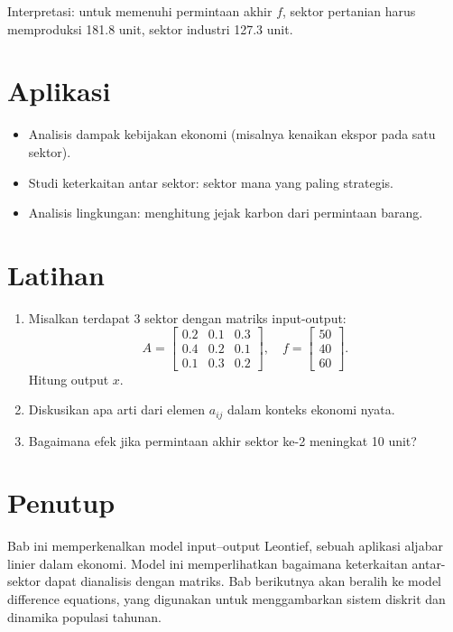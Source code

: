 \documentclass{bukumjh}
\begin{document}
Interpretasi: untuk memenuhi permintaan akhir $f$, sektor pertanian harus memproduksi 181.8 unit, sektor industri 127.3 unit.

\section{Aplikasi}
\begin{itemize}
    \item Analisis dampak kebijakan ekonomi (misalnya kenaikan ekspor pada satu sektor).
    \item Studi keterkaitan antar sektor: sektor mana yang paling strategis.
    \item Analisis lingkungan: menghitung jejak karbon dari permintaan barang.
\end{itemize}

\section{Latihan}
\begin{enumerate}
    \item Misalkan terdapat 3 sektor dengan matriks input-output:
    \[
    A = \begin{bmatrix}
    0.2 & 0.1 & 0.3 \\
    0.4 & 0.2 & 0.1 \\
    0.1 & 0.3 & 0.2
    \end{bmatrix}, \quad
    f = \begin{bmatrix}
    50 \\ 40 \\ 60
    \end{bmatrix}.
    \]
    Hitung output $x$.
    \item Diskusikan apa arti dari elemen $a_{ij}$ dalam konteks ekonomi nyata.
    \item Bagaimana efek jika permintaan akhir sektor ke-2 meningkat 10 unit?
\end{enumerate}

\section{Penutup}
Bab ini memperkenalkan model input–output Leontief, sebuah aplikasi aljabar linier dalam ekonomi. Model ini memperlihatkan bagaimana keterkaitan antar-sektor dapat dianalisis dengan matriks. Bab berikutnya akan beralih ke {\jsg model difference equations}, yang digunakan untuk menggambarkan sistem diskrit dan dinamika populasi tahunan.
\end{document}
